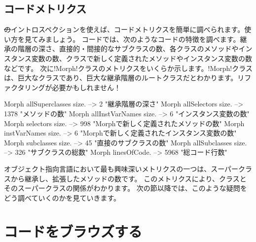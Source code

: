 \documentclass[a4paper,10pt,twoside]{book}
\begin{document}

\subsection{コードメトリクス}

\st のイントロスペクションを使えば、コードメトリクスを簡単に調べられます。使い方を見てみましょう。
コードでは、次のようなコードの特徴を調べます。継承の階層の深さ、直接的・間接的なサブクラスの数、各クラスのメソッドやインスタンス変数の数、クラスで新しく定義されたメソッドやインスタンス変数の数などです。
次に\ct!Morph!クラスのメトリクスをいくらか示します。\ct!Morph!クラスは、巨大なクラスであり、巨大な継承階層のルートクラスだとわかります。リファクタリングが必要かもしれません！

\begin{code}{}
Morph allSuperclasses size.  -->       2 "継承階層の深さ"
Morph allSelectors size.        --> 1378 "メソッドの数"
Morph allInstVarNames size. -->      6 "インスタンス変数の数"
Morph selectors size.             -->  998 "Morphで新しく定義されたメソッドの数"
Morph instVarNames size.     -->      6 "Morphで新しく定義されたインスタンス変数の数"
Morph subclasses size.          -->    45 "直接のサブクラスの数"
Morph allSubclasses size.      -->  326 "サブクラスの総数"
Morph linesOfCode.               --> 5968 "総コード行数"
\end{code}

オブジェクト指向言語において最も興味深いメトリクスの一つは、スーパークラスから継承し、拡張したメソッドの数です。
このメトリクスにより、クラスとそのスーパークラスの関係がわかります。
次の節以降では、このような疑問をどう調べていくのかを見ていきます。

\section{コードをブラウズする}
\end{document}
